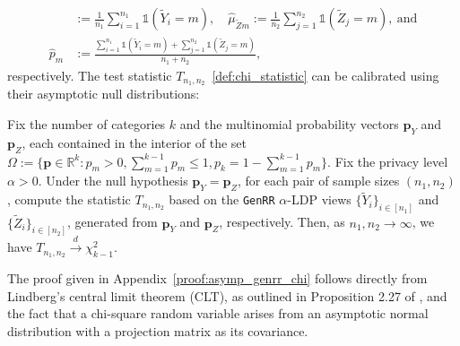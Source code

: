 \documentclass[twoside,11pt]{article}
\newcommand{\rvThree}{Z}
\newcommand{\rvY}{Y}
\newcommand{\rvZ}{Z}
\newcommand{\alphabetSize}{k} %
\newcommand{\vectorIndex}{m}
\newcommand{\sampleSize}{n}
\newcommand{\privacyParameter}{\alpha} %
\begin{document}
\begin{appendix}
\begin{itemize}
\begin{align*}
		&:=
		\frac{1}{\sampleSize_1}
		\sum_{i=1}^{n_1}
		\mathds{1}
		({\tilde{\rvY}_i=\vectorIndex}),
		\quad
		\hat{\mu}_{\tilde{\rvThree} \vectorIndex}
		:=
		\frac{1}{\sampleSize_2}
		\sum_{j=1}^{n_2}
		\mathds{1}
		({\tilde{\rvZ}_j=\vectorIndex}),~\text{and}
		\\
		\hat{p}_\vectorIndex
		&:=
		\frac{
			\sum_{i=1}^{n_1}
			\mathds{1}
			({\tilde{\rvY}_i=\vectorIndex})
			+
			\sum_{j=1}^{n_2}
			\mathds{1}
			({\tilde{\rvZ}_j=\vectorIndex})
		}{\sampleSize_1 + \sampleSize_2},
	\end{align*}
	respectively.
	The test statistic $T_{\sampleSize_1, \sampleSize_2}$~\eqref{def:chi_statistic} can  be calibrated using their asymptotic null distributions:
	\begin{lemma} \label{asymp_genrr_chi}
		Fix the number of categories $\alphabetSize$ and the multinomial probability vectors $\mathbf{p}_Y$ and $\mathbf{p}_Z$, each contained in the interior of the set $\Omega := \{\mathbf{p} \in \mathbb{R}^k : p_\vectorIndex > 0, \sum_{m=1}^{k-1} p_m \leq 1, p_{k} = 1 - \sum_{m=1}^{k-1} p_m\}$. Fix the privacy level $\privacyParameter > 0$. 
		Under the null hypothesis $\mathbf{p}_Y = \mathbf{p}_Z$, for each pair of sample sizes $(n_1, n_2)$, compute the statistic $T_{n_1, n_2}$ based on the  \textnormal{\texttt{GenRR}} $\privacyParameter$-LDP views $\{\tilde{Y}_i\}_{i \in [n_1]}$ and $\{\tilde{Z}_i\}_{i \in [n_2]}$, generated from $\mathbf{p}_Y$ and $\mathbf{p}_Z$, respectively. Then, as $n_1, n_2 \to \infty$, we have $T_{n_1, n_2} \stackrel{d}{\to} \chi^2_{\alphabetSize-1}$.
	\end{lemma}
	The proof given in Appendix~\ref{proof:asymp_genrr_chi} follows directly from Lindberg's central limit theorem (CLT), as outlined in Proposition 2.27 of \citet{van_der_vaart_asymptotic_1998}, and the fact that a chi-square random variable arises from an asymptotic normal distribution with a projection matrix as its covariance. 
	

\end{itemize}
\end{appendix}
\end{document}
